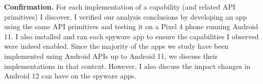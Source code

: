 \textbf{Confirmation.} For each implementation of a capability (and
related API primitives) I discover, I verified our analysis conclusions
by developing an app using the same API primitives and
testing it on a Pixel 4 phone running Android 11. I also installed and ran each spyware app to ensure the capabilities I observed were indeed enabled.
Since the majority of the apps we
study have been implemented using Android APIs up to Android 11, we
discuss their implementations in that context. However, I also
discuss the impact changes in Android 12 can have on the spyware apps.







